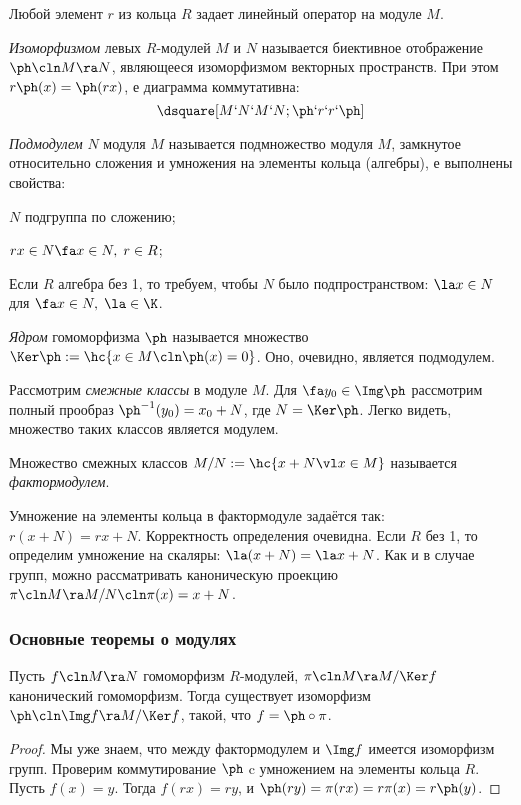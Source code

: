 \documentclass[a4paper]{article}
\begin{document}
Любой элемент $r$ из кольца $R$ задает линейный оператор на модуле $M$.

\begin{df}
\emph{Изоморфизмом} левых $R$-модулей $M$ и $N$ называется биективное отображение $\ph\cln M\ra N$, являющееся
изоморфизмом векторных пространств. При этом $r \ph(x)= \ph(r x)$, е диаграмма коммутативна:
$$\dsquare[M`N`M`N;\ph`r`r`\ph]$$
\end{df}

\begin{df}
\emph{Подмодулем} $N$ модуля $M$ называется подмножество модуля $M$, замкнутое относительно сложения  и
умножения на элементы кольца (алгебры), е выполнены свойства:

 $N$ подгруппа по сложению;

 $rx \in N \fa x \in N, \; r \in R$;

 Если $R$ алгебра без 1, то требуем, чтобы $N$ было подпространством: $\la x \in N$ для  $\fa x
\in N, \; \la \in \K$.
\end{df}

\begin{df}
\emph{Ядром} гомоморфизма $\ph$ называется множество $\Ker \ph := \hc{x \in M\cln \ph(x)=0}$. Оно,  очевидно,
является подмодулем.
\end{df}

Рассмотрим \emph{смежные классы} в модуле $M$. Для $\fa y_0 \in \Img \ph$ рассмотрим полный прообраз
$\ph^{-1}(y_0) = x_0 + N$, где $N=\Ker \ph$. Легко видеть, множество таких классов является модулем.

\begin{df}
Множество смежных классов $M/N:=\hc{x + N \vl x \in M}$ называется \emph{фактормодулем}.
\end{df}

Умножение на элементы кольца в фактормодуле задаётся так: $r(x+N)=rx+N$. Корректность определения  очевидна.
Если $R$ без 1, то определим умножение на скаляры: $\la(x + N)=\la x + N$. Как и в случае групп,
можно рассматривать каноническую проекцию $\pi\cln M \ra M/N\cln \pi(x)=x+N$.

\subsubsection{Основные теоремы о модулях}

\begin{theorem}[О гомоморфизме]
Пусть $f\cln M \ra N$ гомоморфизм $R$-модулей, $\pi\cln M\ra M/\Ker f$ канонический гомоморфизм.  Тогда
существует изоморфизм $\ph\cln \Img f \ra M/\Ker f$, такой, что $f=\ph \circ \pi$.
\end{theorem}
\begin{proof}
Мы уже знаем, что между фактормодулем и $\Img f$ имеется изоморфизм групп. Проверим коммутирование $\ph$
c умножением на элементы кольца $R$. Пусть $f(x)=y$. Тогда $f(rx)=ry$, и $\ph(ry)=\pi(rx)=r\pi(x)=r\ph(y)$.
\end{proof}
\end{document}
